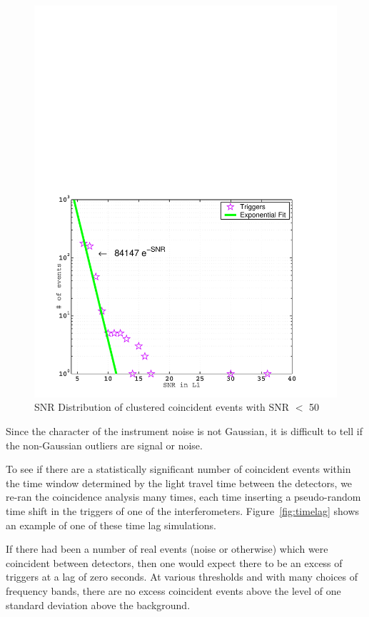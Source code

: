 \begin{figure}[!h]
\centerline{\includegraphics[angle=0,width=6.5in]{Figures/Chap7/co_dist.pdf}}
\caption[Histogram of Coincidences]{SNR Distribution of clustered coincident events
         with SNR $<$ 50}
\label{fig:ce_hist}
\end{figure}
Since the character of the instrument noise is not Gaussian, it is difficult to 
tell if the non-Gaussian outliers are signal or noise.
 
To see if there are a statistically significant number of coincident
events within the time window determined by the light travel time
between the detectors, we re-ran the coincidence analysis many times, 
each time inserting a pseudo-random time shift in the triggers of 
one of the interferometers. Figure~\ref{fig:timelag} shows an 
example of one of these time lag simulations.

If there had been a number of real events (noise or otherwise) which were
coincident between detectors, then one would
expect there to be an excess of triggers at a lag of zero seconds. At various
thresholds and with many choices of frequency bands, there are no excess
coincident events above the level of one standard deviation above the
background.

